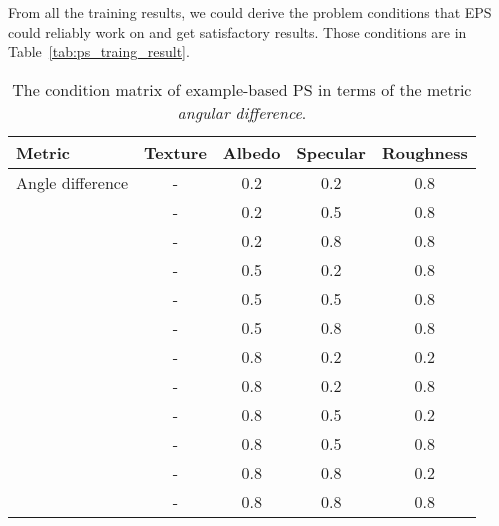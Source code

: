 From all the training results, we could derive the problem conditions that EPS could reliably work on and get satisfactory results. Those conditions are in Table~\ref{tab:ps_traing_result}.
\begin{table}[!htbp]
  \centering
  \begin{tabular}{l*{4}{c}}
  \hline
  \textbf{Metric} & Texture & Albedo & Specular & Roughness\\
  \hline
  Angle difference & - & 0.2 & 0.2 & 0.8\\
                   & - & 0.2 & 0.5 & 0.8\\
                   & - & 0.2 & 0.8 & 0.8\\
                   & - & 0.5 & 0.2 & 0.8\\
                   & - & 0.5 & 0.5 & 0.8\\
                   & - & 0.5 & 0.8 & 0.8\\
                   & - & 0.8 & 0.2 & 0.2\\
                   & - & 0.8 & 0.2 & 0.8\\
                   & - & 0.8 & 0.5 & 0.2\\
                   & - & 0.8 & 0.5 & 0.8\\
                   & - & 0.8 & 0.8 & 0.2\\
                   & - & 0.8 & 0.8 & 0.8\\
  \hline
  \end{tabular}
  \caption{The condition matrix of example-based PS in terms of the metric \textit{angular difference}.}
  \label{tab:ps_training_result}
\end{table}

